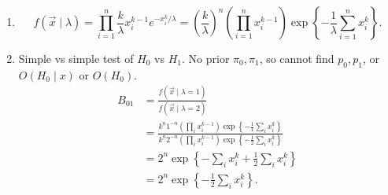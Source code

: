 \documentclass[10pt, a4paper]{article}
\begin{document}
\begin{problem}
    \begin{solution}
        \begin{enumerate}[label = (\arabic*)]
            \item
            \[
            f(\vec{x} \mid \lambda) = \prod_{i = 1}^{n}\frac{k}{\lambda}x_i ^ {k - 1}e ^ {-x_i ^ k / \lambda} = \left(\frac{k}{\lambda}\right) ^ n\left(\prod_{i = 1}^{n}x_i ^ {k - 1}\right)\exp\left\{-\frac{1}{\lambda}\sum_{i = 1}^{n}x_i ^ k\right\}.
            \]

            \item Simple vs simple test of $H_0$ vs $H_1$.
            No prior $\pi_0, \pi_1$,
            so cannot find $p_0, p_1$,
            or $O(H_0 \mid x)$ or $O(H_0)$.
            \begin{align*}
                B_{01} &= \frac{f(\vec{x} \mid \lambda = 1)}{f(\vec{x} \mid \lambda = 2)} \\
                &= \frac{k ^ n1 ^ {-n}\left(\prod_{i}x_i ^ {k - 1}\right)\exp\left\{-\frac{1}{1}\sum_{i}x_i ^ k\right\}}{k ^ n2 ^ {-n}\left(\prod_ix_i ^ {k - 1}\right)\exp\left\{-\frac{1}{2}\sum_{i}x_i ^ k\right\}} \\
                &= 2 ^ n\exp\left\{-\sum_{i}x_i ^ k + \frac{1}{2}\sum_{i}x_i ^ k\right\} \\
                &= 2 ^ n\exp\left\{-\frac{1}{2}\sum_{i}x_i ^ k\right\}.
            \end{align*}


\end{enumerate}
\end{solution}
\end{problem}
\end{document}
